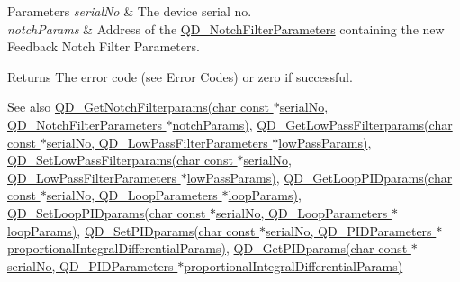 \begin{DoxyParams}{Parameters}
{\em serial\+No} & The device serial no. \\
\hline
{\em notch\+Params} & Address of the \hyperlink{struct_q_d___notch_filter_parameters}{Q\+D\+\_\+\+Notch\+Filter\+Parameters} containing the new Feedback Notch Filter Parameters. \\
\hline
\end{DoxyParams}
\begin{DoxyReturn}{Returns}
The error code (see Error Codes) or zero if successful. 
\end{DoxyReturn}
\begin{DoxySeeAlso}{See also}
\hyperlink{group___t_cube_quad_ga5132ce023e2c0248a42cb5cdf0a95c3e}{Q\+D\+\_\+\+Get\+Notch\+Filterparams(char const $\ast$serial\+No, Q\+D\+\_\+\+Notch\+Filter\+Parameters $\ast$notch\+Params)}, \hyperlink{group___t_cube_quad_ga698c72e36ea50417955b08b69215fcf5}{Q\+D\+\_\+\+Get\+Low\+Pass\+Filterparams(char const $\ast$serial\+No, Q\+D\+\_\+\+Low\+Pass\+Filter\+Parameters $\ast$low\+Pass\+Params)}, \hyperlink{group___t_cube_quad_ga2e8b2f659d9008af335d876976450bc5}{Q\+D\+\_\+\+Set\+Low\+Pass\+Filterparams(char const $\ast$serial\+No, Q\+D\+\_\+\+Low\+Pass\+Filter\+Parameters $\ast$low\+Pass\+Params)}, \hyperlink{group___t_cube_quad_ga9dfc01ca4b37b2f0c662b8d8def06e73}{Q\+D\+\_\+\+Get\+Loop\+P\+I\+Dparams(char const $\ast$serial\+No, Q\+D\+\_\+\+Loop\+Parameters $\ast$loop\+Params)}, \hyperlink{group___t_cube_quad_gad75ed2cff04b2d218326841b2553af0a}{Q\+D\+\_\+\+Set\+Loop\+P\+I\+Dparams(char const $\ast$serial\+No, Q\+D\+\_\+\+Loop\+Parameters $\ast$loop\+Params)}, \hyperlink{group___t_cube_quad_gac4cc242d12537c25f48b86e73138c3d1}{Q\+D\+\_\+\+Set\+P\+I\+Dparams(char const $\ast$serial\+No, Q\+D\+\_\+\+P\+I\+D\+Parameters $\ast$proportional\+Integral\+Differential\+Params)}, \hyperlink{group___t_cube_quad_ga2e1be6be7d8bb5c822766a44205889ae}{Q\+D\+\_\+\+Get\+P\+I\+Dparams(char const $\ast$serial\+No, Q\+D\+\_\+\+P\+I\+D\+Parameters $\ast$proportional\+Integral\+Differential\+Params)}


\end{DoxySeeAlso}
